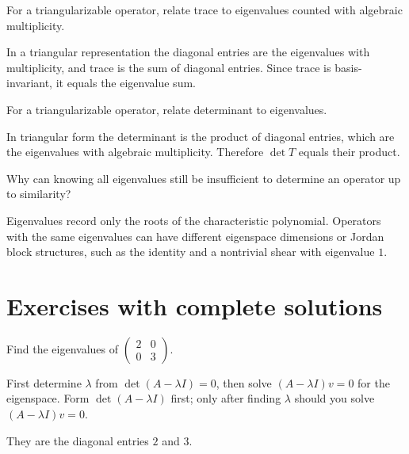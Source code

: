 \begin{problem}\label{prob:i09-problem-10}
For a triangularizable operator, relate trace to eigenvalues counted with algebraic multiplicity.
\end{problem}
\begin{solution}
In a triangular representation the diagonal entries are the eigenvalues with multiplicity, and trace is the sum of diagonal entries. Since trace is basis-invariant, it equals the eigenvalue sum.
\end{solution}

\begin{problem}\label{prob:i09-problem-11}
For a triangularizable operator, relate determinant to eigenvalues.
\end{problem}
\begin{solution}
In triangular form the determinant is the product of diagonal entries, which are the eigenvalues with algebraic multiplicity. Therefore $\det T$ equals their product.
\end{solution}

\begin{problem}\label{prob:i09-problem-12}
Why can knowing all eigenvalues still be insufficient to determine an operator up to similarity?
\end{problem}
\begin{solution}
Eigenvalues record only the roots of the characteristic polynomial. Operators with the same eigenvalues can have different eigenspace dimensions or Jordan block structures, such as the identity and a nontrivial shear with eigenvalue $1$.
\end{solution}


\section{Exercises with complete solutions}

\begin{exercise}\label{exr:i09-01}
Find the eigenvalues of $\begin{pmatrix}2&0\\0&3\end{pmatrix}$.
\end{exercise}
\begin{hint}
First determine \(\lambda\) from \(\det(A-\lambda I)=0\), then solve \((A-\lambda I)v=0\) for the eigenspace. Form \(\det(A-\lambda I)\) first; only after finding \(\lambda\) should you solve \((A-\lambda I)v=0\).
\end{hint}
\begin{solution}
They are the diagonal entries $2$ and $3$.
\end{solution}

